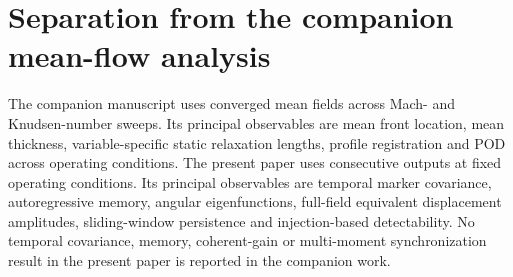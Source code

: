 \section{Separation from the companion mean-flow analysis}
The companion manuscript \citep{RoohiShoja2026Mean} uses converged mean fields across Mach- and Knudsen-number sweeps. Its principal observables are mean front location, mean thickness, variable-specific static relaxation lengths, profile registration and POD across operating conditions. The present paper uses consecutive outputs at fixed operating conditions. Its principal observables are temporal marker covariance, autoregressive memory, angular eigenfunctions, full-field equivalent displacement amplitudes, sliding-window persistence and injection-based detectability. No temporal covariance, memory, coherent-gain or multi-moment synchronization result in the present paper is reported in the companion work.
